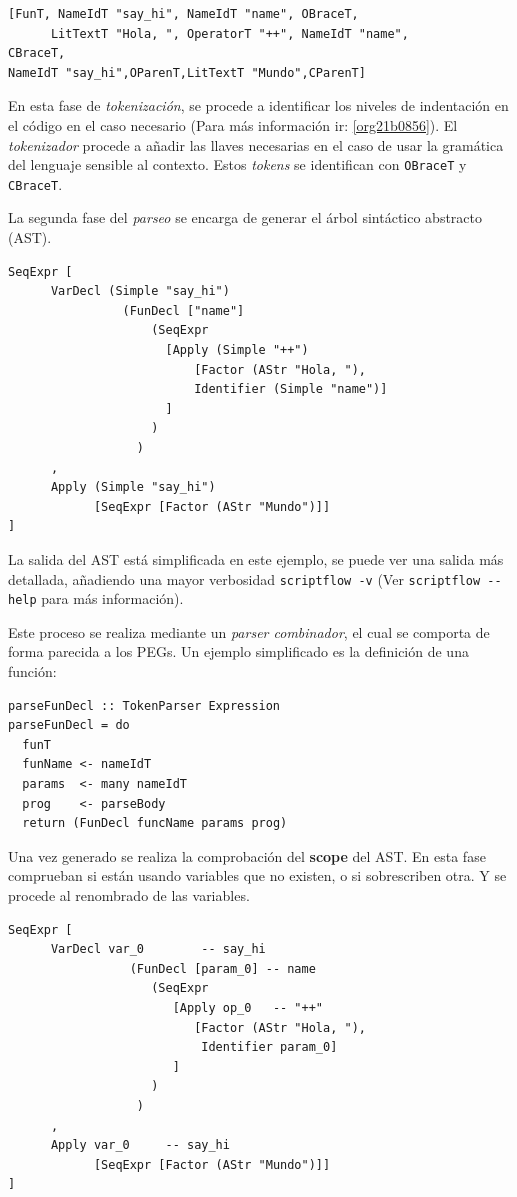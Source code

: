 \documentclass[11pt]{article}
\begin{document}
\begin{verbatim}
[FunT, NameIdT "say_hi", NameIdT "name", OBraceT,
      LitTextT "Hola, ", OperatorT "++", NameIdT "name",
CBraceT,
NameIdT "say_hi",OParenT,LitTextT "Mundo",CParenT]
\end{verbatim}

En esta fase de \emph{tokenización}, se procede a identificar los niveles de
indentación en el código en el caso necesario (Para más información ir: \ref{org21b0856}).
El \emph{tokenizador} procede a añadir las llaves necesarias en el caso de usar la
gramática del lenguaje sensible al contexto. Estos \emph{tokens} se identifican con
\texttt{OBraceT} y \texttt{CBraceT}.

La segunda fase del \emph{parseo} se encarga de generar el árbol sintáctico
abstracto (AST).

\begin{verbatim}
SeqExpr [
      VarDecl (Simple "say_hi")
                (FunDecl ["name"]
                    (SeqExpr
                      [Apply (Simple "++")
                          [Factor (AStr "Hola, "),
                          Identifier (Simple "name")]
                      ]
                    )
                  )
      ,
      Apply (Simple "say_hi")
            [SeqExpr [Factor (AStr "Mundo")]]
]
\end{verbatim}

La salida del AST está simplificada en este ejemplo, se puede ver una salida más detallada,
añadiendo una mayor verbosidad \texttt{scriptflow -v} (Ver \texttt{scriptflow -{}-help} para más información).

Este proceso se realiza mediante un \emph{parser combinador}, el cual se comporta de
forma parecida a los PEGs. Un ejemplo simplificado es la definición de
una función:

\begin{verbatim}
parseFunDecl :: TokenParser Expression
parseFunDecl = do
  funT
  funName <- nameIdT
  params  <- many nameIdT
  prog    <- parseBody
  return (FunDecl funcName params prog)
\end{verbatim}

Una vez generado se realiza la comprobación del \textbf{scope} del AST. En esta fase
comprueban si están usando variables que no existen, o si sobrescriben
otra. Y se procede al renombrado de las variables.

\begin{verbatim}
SeqExpr [
      VarDecl var_0        -- say_hi
                 (FunDecl [param_0] -- name
                    (SeqExpr
                       [Apply op_0   -- "++"
                          [Factor (AStr "Hola, "),
                           Identifier param_0]
                       ]
                    )
                  )
      ,
      Apply var_0     -- say_hi
            [SeqExpr [Factor (AStr "Mundo")]]
]
\end{verbatim}
\end{document}
